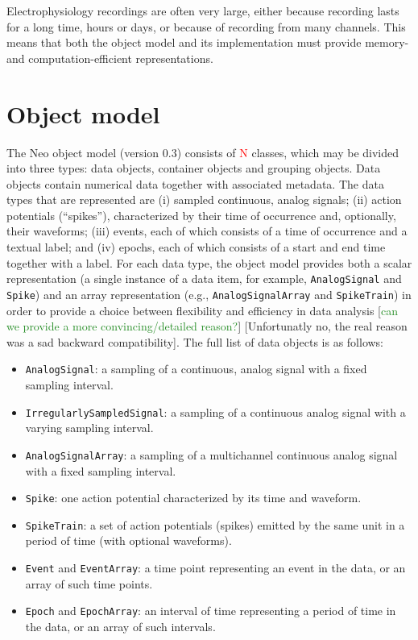 \documentclass{frontiers}
\newcommand{\missing}[1]{\textcolor{red}{#1}}
\newcommand{\andrew}[1]{[\textcolor{ForestGreen}{#1}]}
\newcommand{\samuel}[1]{[\textcolor{RubineRed}{#1}]}
\begin{document}
Electrophysiology recordings are often very large, either because recording lasts for a long time, hours or days, or because of recording from many channels. This means that both the object model and its implementation must provide memory- and computation-efficient representations.


\section{Object model}


The Neo object model (version 0.3) consists of \missing{N} classes, which may be divided into three types: data objects, container objects and grouping objects.
Data objects contain numerical data together with associated metadata.
The data types that are represented are 
(i) sampled continuous, analog signals; 
(ii) action potentials (``spikes''), characterized by their time of occurrence and, optionally, their waveforms; 
(iii) events, each of which consists of a time of occurrence and a textual label; and 
(iv) epochs, each of which consists of a start and end time together with a label.
For each data type, the object model provides both a scalar representation (a single instance of a data item, for example, \lstinline`AnalogSignal` and \lstinline`Spike`) and an array representation (e.g., \lstinline`AnalogSignalArray` and \lstinline`SpikeTrain`) in order to provide a choice between flexibility and efficiency in data analysis \andrew{can we provide a more convincing/detailed reason?} \samuel{Unfortunatly no, the real reason was a sad backward compatibility}.
The full list of data objects is as follows:

\begin{itemize}
\item \lstinline`AnalogSignal`: a sampling of a continuous, analog signal with a fixed sampling interval.
\item \lstinline`IrregularlySampledSignal`: a sampling of a continuous analog signal with a varying sampling interval.
\item \lstinline`AnalogSignalArray`: a sampling of a multichannel continuous analog signal with a fixed sampling interval.
\item \lstinline`Spike`: one action potential characterized by its time and waveform.
\item \lstinline`SpikeTrain`: a set of action potentials (spikes) emitted by the same unit in a period of time (with optional waveforms).
\item \lstinline`Event` and \lstinline`EventArray`: a time point representing an event in the data, or an array of such time points.
\item \lstinline`Epoch` and \lstinline`EpochArray`: an interval of time representing a period of time in the data, or an array of such intervals.
\end{itemize}
\end{document}
